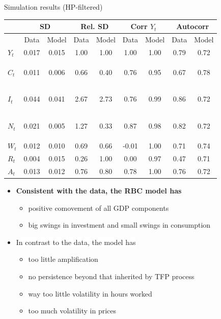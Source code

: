 \documentclass[9pt,xcolor={dvipsnames}]{beamer}
\newcommand{\goodcell}[1]{\begingroup\setlength{\fboxsep}{1.2pt}\colorbox{goodbg}{\strut #1}\endgroup}
\newcommand{\goodcallout}[1]{\begingroup\setlength{\fboxsep}{1.6pt}\colorbox{goodbg}{\textbf{#1}}\endgroup}
\newcommand{\bit}{\begin{itemize}}
\newcommand{\eit}{\end{itemize}}
\begin{document}
\begin{frame}{Simulation results (HP-filtered)}

\begin{table}[h!]
	\centering
	\begin{tabular}{|l|cc|cc|cc|cc|}
		\multicolumn{1}{c}{} &\multicolumn{2}{c}{\textbf{SD}}&\multicolumn{2}{c}{\textbf{Rel. SD}}& \multicolumn{2}{c}{\textbf{Corr $Y_t$}} & \multicolumn{2}{c}{\textbf{Autocorr}}  \\
		\hline
		& Data &Model & Data & Model & Data & Model & Data & Model \\
		\hline
		$Y_t$ & 0.017 & 0.015 & 1.00 & 1.00 & 1.00 & 1.00 & 0.79 & 0.72 \\
		\hline
		$C_t$ & 0.011 & 0.006  & \goodcell{0.66} & \goodcell{0.40} & \goodcell{0.76} & \goodcell{0.95}  & 0.67 & 0.78 \\
		\hline
		$I_t$ & 0.044 & 0.041 & \goodcell{2.67} & \goodcell{2.73}  & \goodcell{0.76} & \goodcell{0.99} & 0.86 & 0.72 \\
		\hline
		$N_t$ & 0.021 &  0.005 & 1.27 & 0.33 & \goodcell{0.87} &  \goodcell{0.98} & 0.82 & 0.72 \\
		\hline
		$W_t$ & 0.012 & 0.010 & 0.69 & 0.66 & -0.01 & 1.00 & 0.71 & 0.74 \\
		\hline
		$R_t$ & 0.004 & 0.015  & 0.26 & 1.00 & 0.00 & 0.97 & 0.47 & 0.71 \\
		\hline
		$A_t$ & 0.013 & 0.012 & 0.76 & 0.80  & 0.78 & 1.00 & 0.76 & 0.72 \\
		\hline
	\end{tabular}
	\captionsetup{font=small}
\end{table} 


\bit
\setlength\itemsep{1em}
\item \goodcallout{Consistent with the data, the RBC model has}
\bit
\item {\color{black} positive comovement of all GDP components}
\item {\color{black} big swings in investment and small swings in consumption}
\eit


\item \colorbox{white}{{\color{white}In contrast to the data, the model has}}
\bit
\item {\color{white} too little amplification}
\item {\color{white} no persistence beyond that inherited by TFP process}
\item {\color{white} way too little volatility in hours worked}
\item {\color{white} too much volatility in prices}
\eit

\eit

\end{frame}
\end{document}
